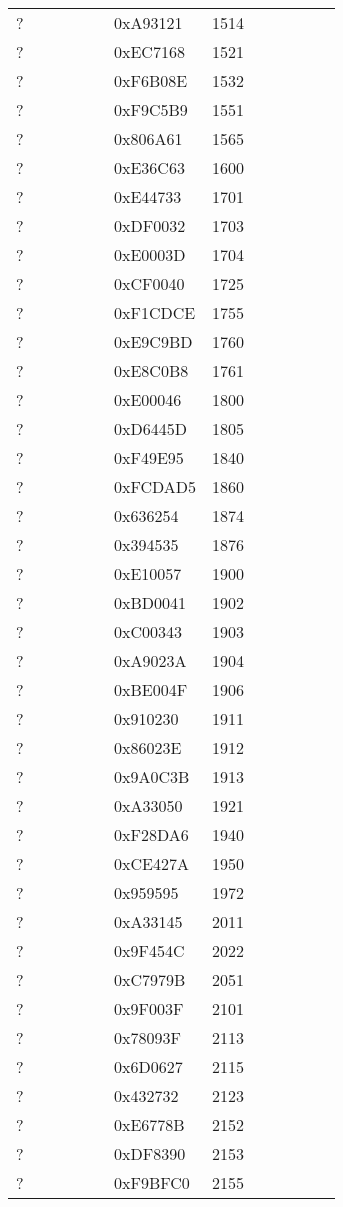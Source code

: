 \begin{longtable}{p{0.3\linewidth} p{0.3\linewidth} p{0.4\linewidth}}
? &  0xA93121 &  1514\\
? &  0xEC7168 &  1521\\
? &  0xF6B08E &  1532\\
? &  0xF9C5B9 &  1551\\
? &  0x806A61 &  1565\\
? &  0xE36C63 &  1600\\
? &  0xE44733 &  1701\\
? &  0xDF0032 &  1703\\
? &  0xE0003D &  1704\\
? &  0xCF0040 &  1725\\
? &  0xF1CDCE &  1755\\
? &  0xE9C9BD &  1760\\
? &  0xE8C0B8 &  1761\\
? &  0xE00046 &  1800\\
? &  0xD6445D &  1805\\
? &  0xF49E95 &  1840\\
? &  0xFCDAD5 &  1860\\
? &  0x636254 &  1874\\
? &  0x394535 &  1876\\
? &  0xE10057 &  1900\\
? &  0xBD0041 &  1902\\
? &  0xC00343 &  1903\\
? &  0xA9023A &  1904\\
? &  0xBE004F &  1906\\
? &  0x910230 &  1911\\
? &  0x86023E &  1912\\
? &  0x9A0C3B &  1913\\
? &  0xA33050 &  1921\\
? &  0xF28DA6 &  1940\\
? &  0xCE427A &  1950\\
? &  0x959595 &  1972\\
? &  0xA33145 &  2011\\
? &  0x9F454C &  2022\\
? &  0xC7979B &  2051\\
? &  0x9F003F &  2101\\
? &  0x78093F &  2113\\
? &  0x6D0627 &  2115\\
? &  0x432732 &  2123\\
? &  0xE6778B &  2152\\
? &  0xDF8390 &  2153\\
? &  0xF9BFC0 &  2155\\

\end{longtable}
